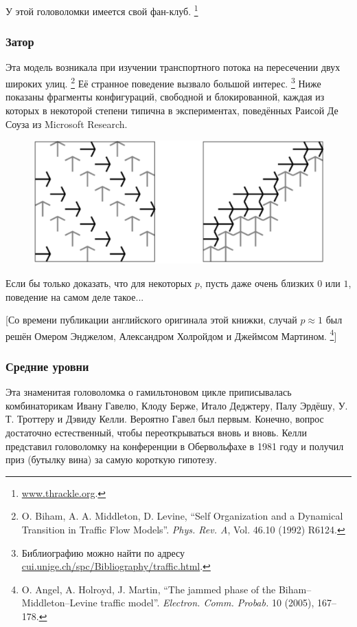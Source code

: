 У этой головоломки имеется свой фан-клуб.%
\footnote{\href{http://www.thrackle.org}{\url{www.thrackle.org}}.}

\subsubsection*{Затор}

Эта модель возникала при изучении транспортного потока на пересечении двух широких улиц.%
\footnote{O. Biham, A. A. Middleton, D. Levine, ``Self Organization and a Dynamical Transition in Traffic Flow Models''. \emph{Phys. Rev. A}, Vol. 46.10 (1992) R6124.}
Её странное поведение вызвало большой интерес.%
\footnote{Библиографию можно найти по адресу \href{http://cui.unige.ch/spc/Bibliography/traffic.html.}{\url{cui.unige.ch/spc/Bibliography/traffic.html}}.}
Ниже показаны фрагменты конфигураций, свободной и блокированной, каждая из которых в некоторой степени типична в экспериментах, поведённых Раисой Де Соуза из Microsoft Research.

\begin{figure}[h!]
\centering
\includegraphics[scale=0.5]{Figs/UnsolvedPuzzles/gridlock}
\end{figure}

Если бы только доказать, что для некоторых $p$, пусть даже очень близких $0$ или $1$, поведение на самом деле такое...

[Со времени публикации английского оригинала этой книжки, случай $p\approx 1$ был решён Омером Энджелом,
Александром Холройдом и Джеймсом Мартином.
\footnote{O. Angel, A. Holroyd, J. Martin, 
``The jammed phase of the Biham--Middleton--Levine traffic model''.
\emph{Electron. Comm. Probab.} 10 (2005), 167--178.}]

\subsubsection*{Средние уровни}

Эта знаменитая головоломка о гамильтоновом цикле приписывалась комбинаторикам Ивану Гавелю, Клоду Берже, Итало Деджтеру, Палу Эрдёшу, У. Т. Троттеру и Дэвиду Келли.
Вероятно Гавел был первым.
Конечно, вопрос достаточно естественный, чтобы переоткрываться вновь и вновь.
Келли представил головоломку на конференции в Обервольфахе в 1981 году и получил приз (бутылку вина) за самую короткую гипотезу.

